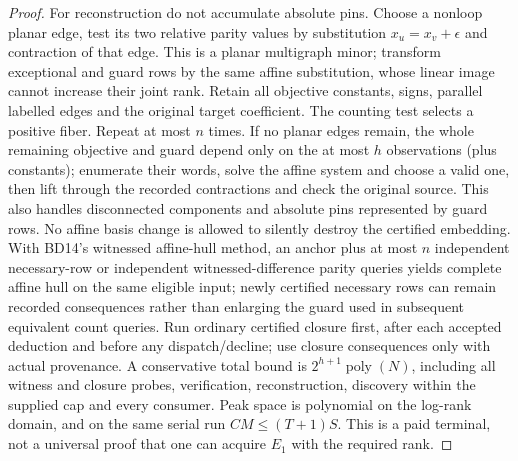 \documentclass[11pt]{article}
\begin{document}
\begin{proof}
For reconstruction do not accumulate absolute pins. Choose a nonloop planar edge, test its two relative parity values by substitution $x_u=x_v+\epsilon$ and contraction of that edge. This is a planar multigraph minor; transform exceptional and guard rows by the same affine substitution, whose linear image cannot increase their joint rank. Retain all objective constants, signs, parallel labelled edges and the original target coefficient. The counting test selects a positive fiber. Repeat at most $n$ times. If no planar edges remain, the whole remaining objective and guard depend only on the at most $h$ observations (plus constants); enumerate their words, solve the affine system and choose a valid one, then lift through the recorded contractions and check the original source. This also handles disconnected components and absolute pins represented by guard rows. No affine basis change is allowed to silently destroy the certified embedding. With BD14's witnessed affine-hull method, an anchor plus at most $n$ independent necessary-row or independent witnessed-difference parity queries yields complete affine hull on the same eligible input; newly certified necessary rows can remain recorded consequences rather than enlarging the guard used in subsequent equivalent count queries. Run ordinary certified closure first, after each accepted deduction and before any dispatch/decline; use closure consequences only with actual provenance. A conservative total bound is $2^{h+1}\operatorname{poly}(N)$, including all witness and closure probes, verification, reconstruction, discovery within the supplied cap and every consumer. Peak space is polynomial on the log-rank domain, and on the same serial run $CM\le(T+1)S$. This is a paid terminal, not a universal proof that one can acquire $E_1$ with the required rank.
\end{proof}
\end{document}
